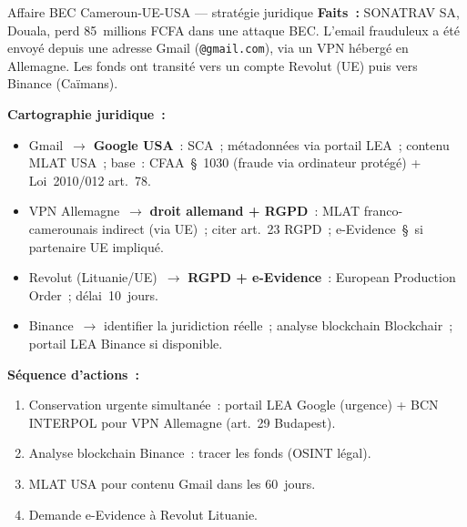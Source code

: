 \begin{boxscenario}{Affaire BEC Cameroun-UE-USA --- stratégie juridique}
\textbf{Faits~:} SONATRAV SA, Douala, perd 85~millions FCFA dans une
attaque BEC. L'email frauduleux a été envoyé depuis une adresse Gmail
(\texttt{@gmail.com}), via un VPN hébergé en Allemagne. Les fonds ont
transité vers un compte Revolut (UE) puis vers Binance (Caïmans).

\textbf{Cartographie juridique~:}
\begin{itemize}
    \item Gmail~$\to$ \textbf{Google USA}~: SCA~; métadonnées via portail
          LEA~; contenu MLAT USA~; base~: CFAA~\S~1030 (fraude via
          ordinateur protégé) + Loi~2010/012 art.~78.
    \item VPN Allemagne~$\to$ \textbf{droit allemand + RGPD}~: MLAT
          franco-camerounais indirect (via UE)~; citer art.~23 RGPD~;
          e-Evidence~\S~si partenaire UE impliqué.
    \item Revolut (Lituanie/UE)~$\to$ \textbf{RGPD + e-Evidence}~:
          European Production Order~; délai~10~jours.
    \item Binance~$\to$ identifier la juridiction réelle~; analyse
          blockchain Blockchair~; portail LEA Binance si disponible.
\end{itemize}

\textbf{Séquence d'actions~:}
\begin{enumerate}
    \item Conservation urgente simultanée~: portail LEA Google (urgence)
          + BCN INTERPOL pour VPN Allemagne (art.~29 Budapest).
    \item Analyse blockchain Binance~: tracer les fonds (OSINT légal).
    \item MLAT USA pour contenu Gmail dans les 60~jours.
    \item Demande e-Evidence à Revolut Lituanie.
\end{enumerate}
\end{boxscenario}

\separateur

